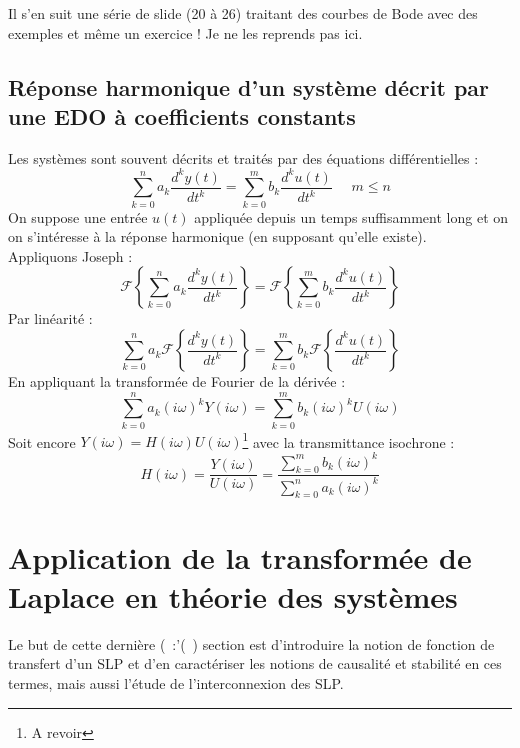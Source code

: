 Il s'en suit une série de slide (20 à 26) traitant des courbes de Bode avec des exemples 
et même un exercice ! Je ne les reprends pas ici.






\subsection{Réponse harmonique d'un système décrit par une EDO à coefficients constants}
Les systèmes sont souvent décrits et traités par des équations différentielles :
\begin{equation}
	\sum_{k=0}^n a_k\dfrac{d^ky(t)}{dt^k} = \sum_{k=0}^m b_k\dfrac{d^ku(t)}{dt^k}\ \ \ \ \ \
	m\leq n
\end{equation}
On suppose une entrée $u(t)$ appliquée depuis un temps suffisamment long et on on s'intéresse
à la réponse harmonique (en supposant qu'elle existe).\\
Appliquons Joseph :
\begin{equation}
	\mathcal{F}\left\{\sum_{k=0}^n a_k\dfrac{d^ky(t)}{dt^k}\right\} =	\mathcal{F}\left\{
	\sum_{k=0}^m b_k\dfrac{d^ku(t)}{dt^k}\right\}
\end{equation}
Par linéarité :
\begin{equation}
	\sum_{k=0}^n a_k\mathcal{F}\left\{\dfrac{d^ky(t)}{dt^k}\right\} =	\sum_{k=0}^m b_k
	\mathcal{F}\left\{\dfrac{d^ku(t)}{dt^k}\right\}
\end{equation}
En appliquant la transformée de Fourier de la dérivée :
\begin{equation}
	\sum_{k=0}^n a_k(i\omega)^kY(i\omega) = \sum_{k=0}^m b_k(i\omega)^kU(i\omega)
\end{equation}
Soit encore $Y(i\omega) = H(i\omega)U(i\omega)$\footnote{A revoir} avec la transmittance 
isochrone :
\begin{equation}
	H(i\omega) = \dfrac{Y(i\omega)}{U(i\omega)} = \dfrac{\sum_{k=0}^m b_k(i\omega)^k
		}{\sum_{k=0}^n a_k(i\omega)^k}
\end{equation}




\section{Application de la transformée de Laplace en théorie des systèmes}
Le but de cette dernière (\ :'(\ ) section est d'introduire la notion de fonction de 
transfert d'un SLP et d'en caractériser les notions de causalité et stabilité en ces
termes, mais aussi l'étude de l'interconnexion des SLP.

